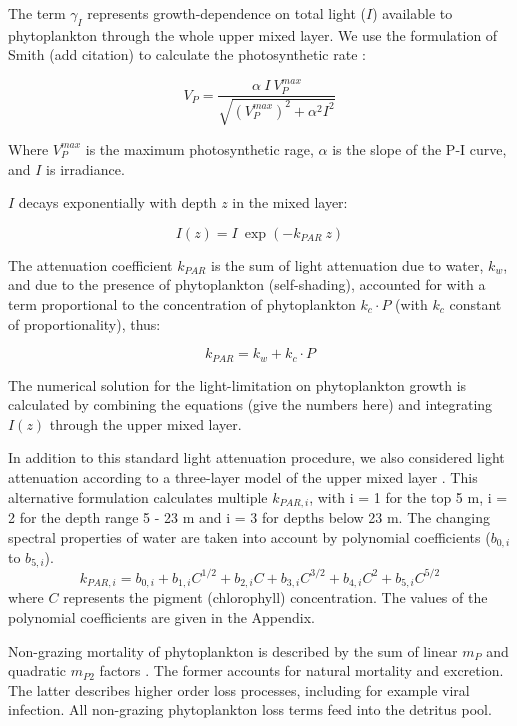 \documentclass[journal abbreviation, manuscript]{copernicus}
\begin{document}
The term $\gamma_{I}$ represents growth-dependence on total light ($I$) available to phytoplankton through the whole upper mixed layer. We use the formulation of Smith (add citation) to calculate the photosynthetic rate \citep{smit}:

\begin{equation}
    V_P = \frac{\alpha ~ I ~ V_P^{max}}{\sqrt{(V_P^{max})^2 + \alpha^2 I^2}}
\end{equation}

Where $V_P^{max}$ is the maximum photosynthetic rage, $\alpha$ is the slope of the P-I curve, and $I$ is irradiance.

$I$ decays exponentially with depth $z$ in the mixed layer:

\begin{equation}
    I(z) = I \ \exp{(-k_{PAR} \ z)}
\end{equation}

The attenuation coefficient $k_{PAR}$ is the sum of light attenuation due to water, $k_w$, and due to the presence of phytoplankton (self-shading), accounted for with a term proportional to the concentration of phytoplankton $k_c \cdot P$ (with $k_c$ constant of proportionality), thus:

\begin{equation}
    k_{PAR} = k_w + k_c \cdot P
\end{equation}

The numerical solution for the light-limitation on phytoplankton growth is calculated by combining the equations (give the numbers here) and integrating $I(z)$ through the upper mixed layer.

In addition to this standard light attenuation procedure, we also considered light attenuation according to a three-layer model of the upper mixed layer  \citep{Anderson1993APhotosynthesis}. This alternative formulation calculates multiple $k_{PAR, i}$, with i = 1 for the top 5 \unit{m}, i = 2 for the depth range 5 - 23 \unit{m} and i = 3 for depths below 23 \unit{m}. The changing spectral properties of water are taken into account by polynomial coefficients ($b_{0,i}$ to $b_{5,i}$).
\begin{equation}
    k_{PAR, i} = b_{0,i} + b_{1,i} C^{1/2} + b_{2,i} C + b_{3,i} C^{3/2} + b_{4,i} C^2 + b_{5,i} C^{5/2}
\end{equation}
where $C$ represents the pigment (chlorophyll) concentration. The values of the polynomial coefficients are given in the Appendix.

Non-grazing mortality of phytoplankton is described by the sum of linear $m_P$ and quadratic $m_{P2}$ factors \citep{Yool2011Medusa-1.0:Domain}. The former accounts for natural mortality and excretion. The latter describes higher order loss processes, including for example viral infection. All non-grazing phytoplankton loss terms feed into the detritus pool.
\end{document}
